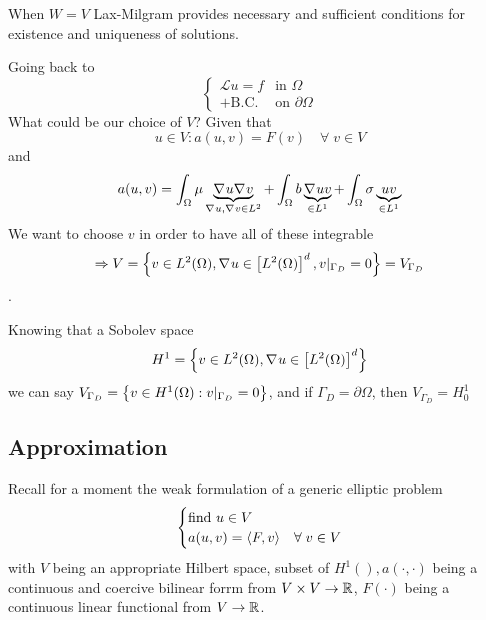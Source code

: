When \(W=V\) Lax-Milgram provides necessary and sufficient conditions for existence and uniqueness of solutions.

Going back to 
\begin{equation*}
    \begin{cases}
        \mathcal{L}u = f & \text{in }\Omega \\
        + \text{B.C.} & \text{on }\partial\Omega
    \end{cases}
\end{equation*}
What could be our choice of \(V\)? Given that
\[
    u\in V : a(u,v) = F(v) \quad \forall \; v \in V
\]
and 
\[
    a(u,v) = \int_\Omega \mu \underbrace{\nabla\mspace{1mu} u \nabla\mspace{1mu} v}_{\nabla\mspace{1mu} u, \nabla\mspace{1mu} v \in L^2} + \int_\Omega b \underbrace{\nabla\mspace{1mu} u v}_{\in L^1} + \int_\Omega \sigma \underbrace{u v}_{\in L^1}
\]
We want to choose \(v\) in order to have all of these integrable \[\Rightarrow V = \left\{v \in L^2(\Omega), \nabla\mspace{1mu} u \in \left[L^2(\Omega)\right]^d, v\vert_{\Gamma_D} = 0\right\} = V_{\Gamma_D}\].

Knowing that a Sobolev space 
\[
    H^1 = \left\{v \in L^2(\Omega), \nabla\mspace{1mu} u \in \left[L^2(\Omega)\right]^d\right\}
\]
we can say \(V_{\Gamma_D} = \left\{v \in H^1(\Omega): v\vert_{\Gamma_D}= 0\right\}\), and if \(\Gamma_D = \partial\Omega\), then \(V_{\Gamma_D} = H^1_0\)
\subsection{Approximation}
Recall for a moment the weak formulation of a generic elliptic problem 
\begin{equation}
    \begin{cases}
        \text{find } u \in V \\
        a(u,v) = \langle F,v \rangle & \forall \; v \in V \label{Weak Formulation of Boundary Value Problems - 2}
    \end{cases}
\end{equation}
with \(V\) being an appropriate Hilbert space, subset of \(H^1(), a(\cdot,\cdot)\) being a continuous and coercive bilinear forrm from \(V \times V \to \mathbb{R}\), \(F(\cdot)\) being a continuous linear functional from \(V \to \mathbb{R}\).

